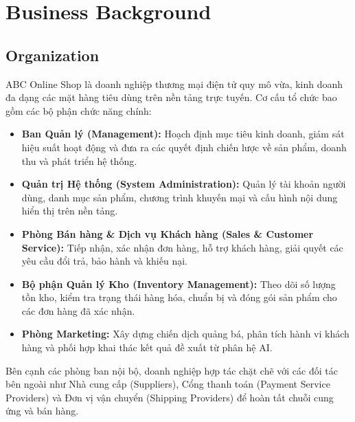\documentclass[12pt,a4paper,oneside]{report}
\begin{document}
\section{Business Background}

\subsection{Organization}

ABC Online Shop là doanh nghiệp thương mại điện tử quy mô vừa, kinh doanh đa dạng các mặt hàng tiêu dùng trên nền tảng trực tuyến. Cơ cấu tổ chức bao gồm các bộ phận chức năng chính:

\begin{itemize}
  \item \textbf{Ban Quản lý (Management):} Hoạch định mục tiêu kinh doanh, giám sát hiệu suất hoạt động và đưa ra các quyết định chiến lược về sản phẩm, doanh thu và phát triển hệ thống.
  \item \textbf{Quản trị Hệ thống (System Administration):} Quản lý tài khoản người dùng, danh mục sản phẩm, chương trình khuyến mại và cấu hình nội dung hiển thị trên nền tảng.
  \item \textbf{Phòng Bán hàng \& Dịch vụ Khách hàng (Sales \& Customer Service):} Tiếp nhận, xác nhận đơn hàng, hỗ trợ khách hàng, giải quyết các yêu cầu đổi trả, bảo hành và khiếu nại.
  \item \textbf{Bộ phận Quản lý Kho (Inventory Management):} Theo dõi số lượng tồn kho, kiểm tra trạng thái hàng hóa, chuẩn bị và đóng gói sản phẩm cho các đơn hàng đã xác nhận.
  \item \textbf{Phòng Marketing:} Xây dựng chiến dịch quảng bá, phân tích hành vi khách hàng và phối hợp khai thác kết quả đề xuất từ phân hệ AI.
\end{itemize}

Bên cạnh các phòng ban nội bộ, doanh nghiệp hợp tác chặt chẽ với các đối tác bên ngoài như Nhà cung cấp (Suppliers), Cổng thanh toán (Payment Service Providers) và Đơn vị vận chuyển (Shipping Providers) để hoàn tất chuỗi cung ứng và bán hàng.
\end{document}
